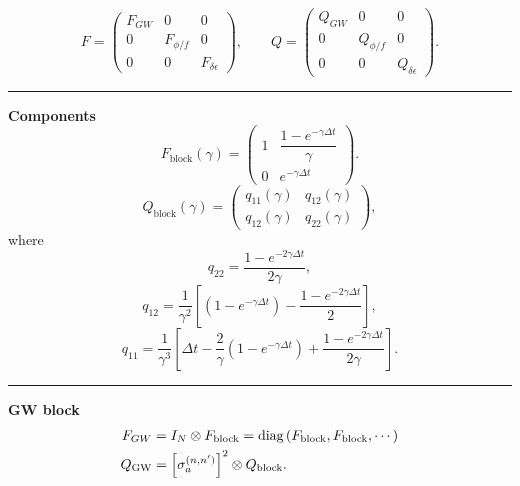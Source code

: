 \documentclass{tufte-handout} %
\begin{document}
\begin{equation}
	F = \begin{pmatrix}
		F_{GW} & 0 & 0\\[1mm]
		0 & F_{\phi/f} & 0\\[1mm]
		0 & 0 & F_{\delta\epsilon}
	\end{pmatrix},\qquad
	Q = \begin{pmatrix}
		Q_{GW} & 0 & 0\\[1mm]
		0 & Q_{\phi/f} & 0\\[1mm]
		0 & 0 & Q_{\delta\epsilon}
	\end{pmatrix}.
\end{equation}
\hrule \vspace{2mm}
\noindent \textbf{Components}
\begin{equation}
	F_{\text{block}} \left( \gamma\right) =
	\begin{pmatrix}
		1 & \dfrac{1-e^{-\gamma\Delta t}}{\gamma} \\[1mm]
		0 & e^{-\gamma\Delta t}
	\end{pmatrix}.
\end{equation}
\begin{equation}
	Q_{\text{block}} \left( \gamma\right) = \begin{pmatrix}
		q_{11}\left( \gamma\right) & q_{12}\left( \gamma\right)\\[1mm]
		q_{12}\left( \gamma\right) & q_{22}\left( \gamma\right)
	\end{pmatrix},
\end{equation}
where
\begin{equation}
	q_{22} = \frac{1-e^{-2\gamma\Delta t}}{2\gamma},
\end{equation}
\begin{equation}
	q_{12} = \frac{1}{\gamma^2}\left[\left(1-e^{-\gamma\Delta t}\right)-\frac{1-e^{-2\gamma\Delta t}}{2}\right],
\end{equation}
\begin{equation}
	q_{11} = \frac{1}{\gamma^3}\left[\Delta t-\frac{2}{\gamma}\left(1-e^{-\gamma\Delta t}\right)+\frac{1-e^{-2\gamma\Delta t}}{2\gamma}\right].
\end{equation}
\hrule \vspace{2mm}


\noindent \textbf{GW block}
\begin{align}
	F_{GW} &= I_N \otimes F_{\text{block}} = \text{diag} \left(F_{\text{block}},F_{\text{block}},\cdots\right) \\
		Q_{\rm GW} &=  \Bigl[\sigma^{(n,n')}_a\Bigr]^2 \otimes Q_{\text{block}}.
\end{align}
\end{document}
